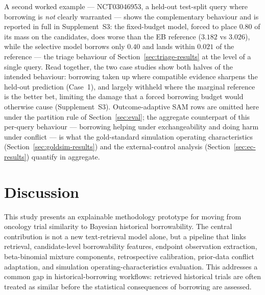 \documentclass[11pt]{article}
\begin{document}
A second worked example --- NCT03046953, a held-out test-split query where
borrowing is \emph{not} clearly warranted --- shows the complementary
behaviour and is reported in full in Supplement~S3: the fixed-budget model,
forced to place $0.80$ of its mass on the candidates, does worse than the
EB reference ($3.182$ vs $3.026$), while the selective model borrows only
$0.40$ and lands within $0.021$ of the reference --- the triage behaviour
of Section~\ref{sec:triage-results} at the level of a single query. Read
together, the two case studies show both halves of the intended
behaviour: borrowing taken up where compatible evidence sharpens the
held-out prediction (Case~1), and largely withheld where the marginal
reference is the better bet, limiting the damage that a forced borrowing
budget would otherwise cause (Supplement~S3). Outcome-adaptive SAM rows
are omitted
here under the partition rule of Section~\ref{sec:eval}; the aggregate
counterpart of this per-query behaviour --- borrowing helping under
exchangeability and doing harm under conflict --- is what the gold-standard
simulation operating characteristics (Section~\ref{sec:goldsim-results}) and the
external-control analysis (Section~\ref{sec:ec-results}) quantify in aggregate.

\section{Discussion}

This study presents an explainable methodology prototype for moving from
oncology trial similarity to Bayesian historical borrowability. The central
contribution is not a new text-retrieval model alone, but a pipeline that
links retrieval, candidate-level borrowability features, endpoint observation
extraction, beta-binomial mixture components, retrospective calibration,
prior-data conflict adaptation, and simulation operating-characteristics
evaluation. This addresses a common gap in historical-borrowing workflows:
retrieved historical trials are often treated as similar before the
statistical consequences of borrowing are assessed.
\end{document}

